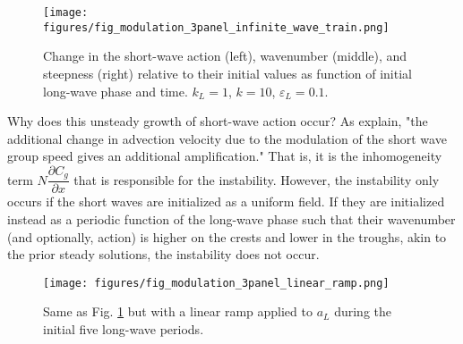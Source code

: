 \documentclass[lineno]{jfm}
\begin{document}
\begin{figure}
\centering
\texttt{[image: figures/fig\_modulation\_3panel\_infinite\_wave\_train.png]}
\caption{
  Change in the short-wave action (left), wavenumber (middle), and steepness (right)
  relative to their initial values as function of initial long-wave phase and time.
  $k_L = 1$, $k = 10$, $\varepsilon_L = 0.1$.
}
\label{fig:modulation_3panel_infinite}
\end{figure}

Why does this unsteady growth of short-wave action occur?
As \citet{peureux2021unsteady} explain, "the additional change in advection
velocity due to the modulation of the short wave group speed gives an additional
amplification."
That is, it is the inhomogeneity term $N \dfrac{\partial C_g}{\partial x}$ that
is responsible for the instability.
However, the instability only occurs if the short waves are initialized as a
uniform field.
If they are initialized instead as a periodic function of the long-wave phase
such that their wavenumber (and optionally, action) is higher on the crests
and lower in the troughs, akin to the prior steady solutions, the instability
does not occur.

\begin{figure}
\centering
\texttt{[image: figures/fig\_modulation\_3panel\_linear\_ramp.png]}
\caption{
  Same as Fig. \ref{fig:modulation_3panel_infinite} but with a linear ramp
  applied to $a_L$ during the initial five long-wave periods.
}
\label{fig:modulation_3panel_ramp}
\end{figure}
\end{document}

